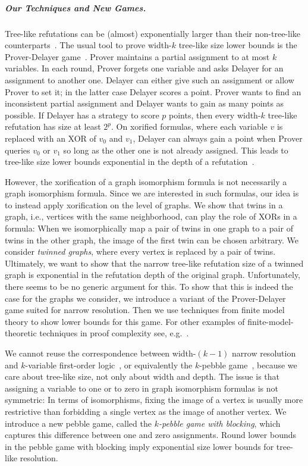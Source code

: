 \documentclass[a4paper,english, thm-restate]{lipics-v2021}
\begin{document}
\subparagraph*{Our Techniques and New Games.}
Tree-like refutations can be (almost) exponentially larger than their non-tree-like counterparts~\cite{Ben-SassonIW2004}.
The usual tool to prove width-$k$ tree-like size lower bounds is the Prover-Delayer game~\cite{PudlakImpagliazzo2000}.
Prover maintains a partial assignment to at most $k$ variables.
In each round, Prover forgets one variable and asks Delayer for an assignment to another one. Delayer can either give such an assignment or allow Prover to set it; in the latter case Delayer scores a point.
Prover wants to find an inconsistent partial assignment and Delayer wants to gain as many points as possible. If Delayer has a strategy to score $p$ points, then every width-$k$ tree-like refutation has size at least $2^p$.
On xorified formulas, where each variable $v$ is replaced with an XOR of $v_0$ and $v_1$,
Delayer can always gain a point when Prover queries $v_0$ or $v_1$ so long as the other one is not already assigned. 
This leads to tree-like size lower bounds exponential in the depth of a refutation~\cite{Urquhart2011}.

However, the xorification of a graph isomorphism formula is not necessarily a graph isomorphism formula. Since we are interested in such formulas,
our idea is to instead apply xorification on the level of graphs. We show that twins in a graph, i.e., vertices with the same neighborhood, can play the role of XORs in a formula:
When we isomorphically map a pair of twins in one graph to a pair of twins in the other graph, the image of the first twin can be chosen arbitrary.
We consider \emph{twinned graphs}, where  every vertex is replaced by a pair of twins.
Ultimately, we want to show that the narrow tree-like refutation size  of a twinned graph is exponential in the refutation depth of the original graph.
Unfortunately, there seems to be no generic argument for this.
To show that this is indeed the case for the graphs we consider,
we introduce a variant of the Prover-Delayer game suited for narrow resolution.
Then we use techniques from finite model theory to show lower bounds for this game.
For other examples of 
%
finite-model-theoretic techniques in proof complexity see,
e.g.~\cite{Berkholz2012,DBLP:journals/jcss/AtseriasD08,GradelGPP2019}.

We cannot reuse the correspondence between width-$(k-1)$ narrow resolution and $k$\nobreakdash-variable
 first-order logic~\cite{DBLP:journals/tocl/ToranW23}, or equivalently the $k$-pebble game~\cite{DBLP:journals/jcss/Immerman82},
because we care about tree-like size, not only about width and depth.
The issue is that assigning a variable to one or to zero in graph isomorphism formulas is not symmetric: In terms of isomorphisms,
fixing the image of a vertex is usually more restrictive than forbidding a single vertex as the image of another vertex.
%
%
We introduce a new pebble game, called the \emph{$k$-pebble game with blocking}, which captures this difference between one and zero assignments.
%
%
Round lower bounds in the pebble game with blocking imply
%
exponential size lower bounds for tree-like resolution.
\end{document}
